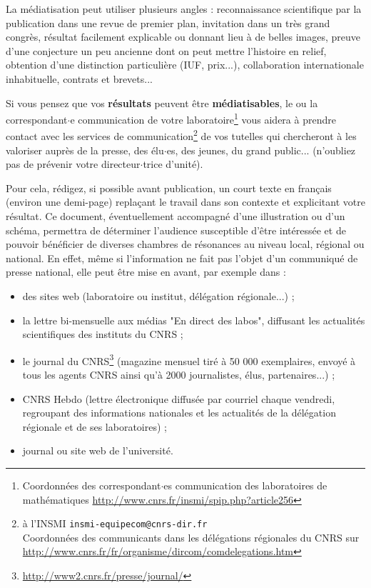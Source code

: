 La m\'ediatisation peut utiliser plusieurs angles : reconnaissance scientifique par la publication dans une
revue de premier plan, invitation dans un tr\`es grand congr\`es, r\'esultat facilement explicable ou donnant
 lieu \`a de belles images, preuve d'une conjecture un peu ancienne dont on peut mettre l'histoire en relief,
obtention d'une distinction particuli\`ere (IUF, prix...), collaboration internationale inhabituelle, contrats et brevets...

\medskip\par
Si vous pensez que vos \textbf{r\'esultats} peuvent \^etre \textbf{m\'ediatisables}, le ou la correspondant$\cdot$e
 communication de votre laboratoire\footnote{Coordonn\'ees des correspondant$\cdot$es communication des
 laboratoires de math\'ematiques \url{http://www.cnrs.fr/insmi/spip.php?article256}} vous aidera \`a prendre
 contact avec les services de communication\footnote{\`a l'INSMI \texttt{insmi-equipecom@cnrs-dir.fr}\\
Coordonn\'ees des communicants dans les d\'el\'egations r\'egionales du CNRS sur \url{http://www.cnrs.fr/fr/organisme/dircom/comdelegations.htm}} de vos tutelles qui chercheront \`a les valoriser
aupr\`es de la presse, des \'elu$\cdot$es, des jeunes, du grand public... (n'oubliez pas de pr\'evenir votre directeur$\cdot$trice d'unit\'e).

Pour cela, r\'edigez, si possible avant publication, un court texte en fran\c cais (environ une demi-page)
 repla\c cant le travail dans son contexte et explicitant votre r\'esultat.
Ce document, \'eventuellement accompagn\'e d'une illustration ou d'un sch\'ema, permettra de d\'eterminer
 l'audience susceptible d'\^etre int\'eress\'ee et de pouvoir b\'en\'eficier de diverses chambres de r\'esonances
 au niveau local, r\'egional ou national.
En effet, m\^eme si l'information ne fait pas l'objet d'un communiqu\'e de presse national, elle peut \^etre mise
en avant, par exemple dans :
\begin{itemize}
 \item des sites web (laboratoire ou institut, d\'el\'egation r\'egionale...) ;
 \item la lettre bi-mensuelle aux m\'edias "En direct des labos", diffusant les actualit\'es scientifiques
 des instituts du CNRS ;
 \item le journal du CNRS\footnote{\url{http://www2.cnrs.fr/presse/journal/}} (magazine mensuel
 tir\'e \`a 50 000 exemplaires, envoy\'e \`a tous les agents CNRS ainsi qu'\`a 2000 journalistes, \'elus, partenaires...) ;
 \item CNRS Hebdo (lettre \'electronique diffus\'ee par courriel chaque vendredi, regroupant des informations
nationales et les actualit\'es de la d\'el\'egation r\'egionale et de ses laboratoires) ;
 \item journal ou site web de l'universit\'e.
\end{itemize}

